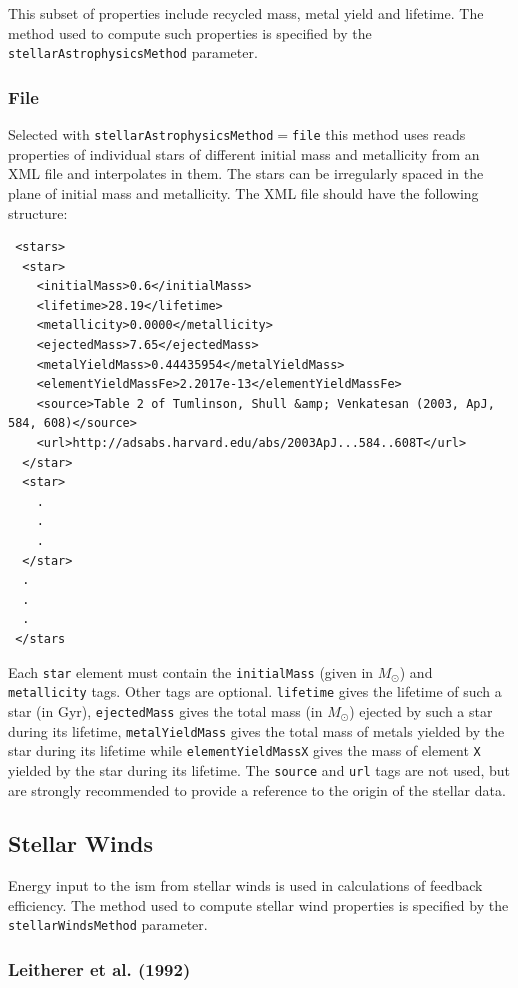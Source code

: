 This subset of properties include recycled mass, metal yield and lifetime.  The method used to compute such properties is specified by the {\tt stellarAstrophysicsMethod} parameter.

\subsubsection{File}\label{sec:StellarAstrophysicsFile}

Selected with {\tt stellarAstrophysicsMethod}$=${\tt file} this method uses reads properties of individual stars of different initial mass and metallicity from an XML file and interpolates in them. The stars can be irregularly spaced in the plane of initial mass and metallicity. The XML file should have the following structure:
\begin{verbatim}
 <stars>
  <star>
    <initialMass>0.6</initialMass>
    <lifetime>28.19</lifetime>
    <metallicity>0.0000</metallicity>
    <ejectedMass>7.65</ejectedMass>
    <metalYieldMass>0.44435954</metalYieldMass>
    <elementYieldMassFe>2.2017e-13</elementYieldMassFe>
    <source>Table 2 of Tumlinson, Shull &amp; Venkatesan (2003, ApJ, 584, 608)</source>
    <url>http://adsabs.harvard.edu/abs/2003ApJ...584..608T</url>
  </star>
  <star>
    .
    .
    .
  </star>
  .
  .
  .
 </stars
\end{verbatim}
Each {\tt star} element must contain the {\tt initialMass} (given in $M_\odot$) and {\tt metallicity} tags. Other tags are optional. {\tt lifetime} gives the lifetime of such a star (in Gyr), {\tt ejectedMass} gives the total mass (in $M_\odot$) ejected by such a star during its lifetime, {\tt metalYieldMass} gives the total mass of metals yielded by the star during its lifetime while {\tt elementYieldMassX} gives the mass of element {\tt X} yielded by the star during its lifetime. The {\tt source} and {\tt url} tags are not used, but are strongly recommended to provide a reference to the origin of the stellar data.

\subsection{Stellar Winds}

Energy input to the \gls{ism} from stellar winds is used in calculations of feedback efficiency. The method used to compute stellar wind properties is specified by the {\tt stellarWindsMethod} parameter.

\subsubsection{Leitherer et al. (1992)}


